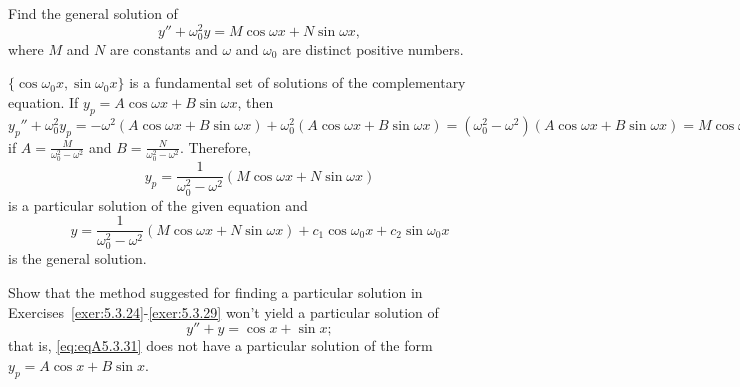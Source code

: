 \documentclass{ximera}
\begin{document}
\begin{problem}\label{exer:5.3.30}
Find the general solution of
$$
y''+\omega_0^2y =M\cos\omega x+N\sin\omega x,
$$
where $M$ and $N$ are constants and
 $\omega$ and $\omega_0$ are distinct  positive numbers.
 \begin{solution}
$\{\cos\omega_0x,\sin\omega_0x\}$ is a fundamental set of
solutions of the complementary equation.
If $y_p=A\cos\omega x+B\sin\omega x$, then $y_p''+\omega_0^2y_p=
-\omega^2(A\cos\omega x+B\sin\omega x)+\omega_0^2(A\cos\omega
x+B\sin\omega x)=(\omega_0^2-\omega^2)(A\cos\omega x+B\sin\omega x)
=M\cos\omega x+N\sin\omega x$ if
$A=\frac{M}{\omega_0^2-\omega^2}$ and
$B=\frac{N}{\omega_0^2-\omega^2}$. Therefore,
$$
y_p= \frac{1}{\omega_0^2-\omega^2}(M\cos\omega
x+N\sin\omega x)
$$
is a particular solution of the given equation and
$$
y=\frac{1}{\omega_0^2-\omega^2}(M\cos\omega x+N\sin\omega
x)+c_1\cos\omega_0x+c_2\sin\omega_0x
$$
 is the general solution.
 \end{solution}
\end{problem}

\begin{problem}\label{exer:5.3.31}
Show that the method suggested for finding a particular
solution in Exercises~\ref{exer:5.3.24}-\ref{exer:5.3.29}
won't yield a particular solution of \begin{equation}\label{eq:eqA5.3.31}
y''+y=\cos x+\sin x;
\end{equation}
that is, \ref{eq:eqA5.3.31} does not have a particular
solution of the form $y_p=A\cos x+B\sin x$.
\end{problem}
\end{document}
